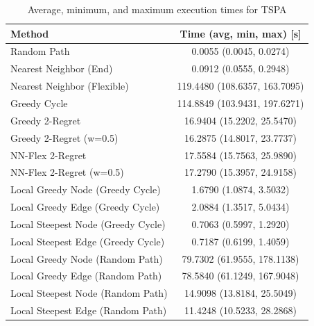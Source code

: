 \begin{table}[h!]
\centering
\begin{tabular}{lc}
\hline
Method & Time (avg, min, max) [s] \\
\hline
Random Path & 0.0055 (0.0045, 0.0274) \\
Nearest Neighbor (End) & 0.0912 (0.0555, 0.2948) \\
Nearest Neighbor (Flexible) & 119.4480 (108.6357, 163.7095) \\
Greedy Cycle & 114.8849 (103.9431, 197.6271) \\
Greedy 2-Regret & 16.9404 (15.2202, 25.5470) \\
Greedy 2-Regret (w=0.5) & 16.2875 (14.8017, 23.7737) \\
NN-Flex 2-Regret & 17.5584 (15.7563, 25.9890) \\
NN-Flex 2-Regret (w=0.5) & 17.2790 (15.3957, 24.9158) \\
Local Greedy Node (Greedy Cycle) & 1.6790 (1.0874, 3.5032) \\
Local Greedy Edge (Greedy Cycle) & 2.0884 (1.3517, 5.0434) \\
Local Steepest Node (Greedy Cycle) & 0.7063 (0.5997, 1.2920) \\
Local Steepest Edge (Greedy Cycle) & 0.7187 (0.6199, 1.4059) \\
Local Greedy Node (Random Path) & 79.7302 (61.9555, 178.1138) \\
Local Greedy Edge (Random Path) & 78.5840 (61.1249, 167.9048) \\
Local Steepest Node (Random Path) & 14.9098 (13.8184, 25.5049) \\
Local Steepest Edge (Random Path) & 11.4248 (10.5233, 28.2868) \\
\hline
\end{tabular}
\caption{Average, minimum, and maximum execution times for TSPA}
\label{tab:TSPA_timings}
\end{table}
